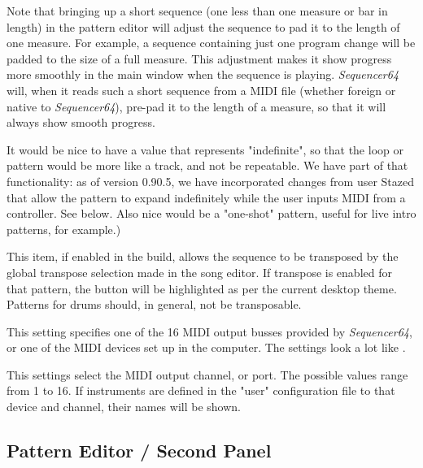   Note that bringing up a short sequence (one less than one measure or bar in
   length) in the pattern editor will adjust the sequence to pad it to the
   length of one measure.  For example, a sequence containing just one program
   change will be padded to the size of a full measure.
   This adjustment makes it show progress more smoothly in the main window when
   the sequence is playing.
   \textsl{Sequencer64} will, when it reads such a short sequence
   from a MIDI file (whether foreign or native to \textsl{Sequencer64}),
   pre-pad it to the length of a measure, so that it will always show smooth
   progress.

   It would be nice to have a value that represents
   "indefinite", so that the loop or pattern would be more like a track,
   and not be repeatable.  We have part of that functionality:
   as of version 0.90.5, we have incorporated changes from user
   Stazed that allow the pattern to expand indefinitely while the user inputs
   MIDI from a controller.
   See  below.
   Also nice would be a "one-shot"
   pattern, useful for live intro patterns, for example.)

   This item, if enabled in the build, allows the sequence to be transposed by
   the global transpose selection made in the song editor.  If transpose is
   enabled for that pattern, the button will be highlighted as per the current
   desktop theme.  Patterns for drums should, in general, not be transposable.

   This setting specifies one of the 16 MIDI output busses provided by
   \textsl{Sequencer64}, or one of the MIDI devices set up in the computer.
   The settings look a lot like
   .

   This settings select the MIDI output channel, or port.
   The possible values range from 1 to 16.
   If instruments are defined in the "user" configuration file
   to that device and channel, their names will be shown.

\subsection{Pattern Editor / Second Panel}
\label{subsec:seq64_pattern_editor_second}

